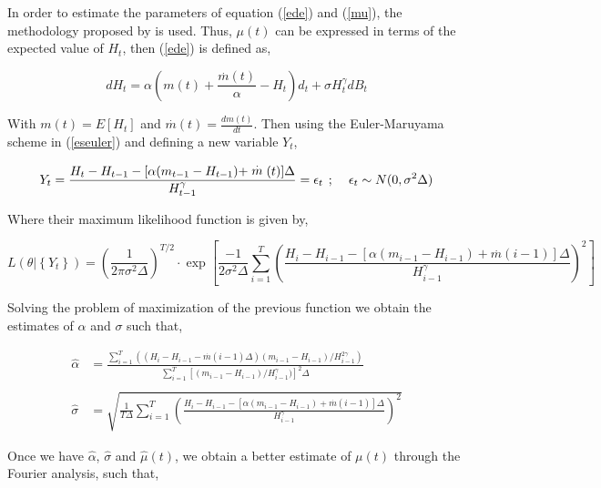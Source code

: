 \documentclass[12pt,halfline,a4paper]{ouparticle}
\begin{document}
In order to estimate the parameters of equation (\ref{ede}) and (\ref{mu}), the methodology proposed by \cite{Monsalve2017} is used. Thus, $\mu(t)$ can be expressed in terms of the expected value of $H_{t}$, then (\ref{ede}) is defined as,

\begin{equation}
\label{eseuler}
dH_{t}=\alpha \left(m(t)+\frac{\stackrel{.}{m}(t)}{\alpha}-H_{t}\right)d_{t}+\sigma H_{t}^{\gamma}dB_{t}
\end{equation}

With $m(t)=E[H_{t}]$ and $\stackrel{.}{m}(t)=\frac{dm(t)}{dt}$. Then using the Euler-Maruyama scheme in (\ref{eseuler}) and defining a new variable $Y_{t}$,

\begin{equation}
Y_{t}=\frac{H_{t}-H_{t-1}-[\alpha(m_{t-1}-H_{t-1})+\stackrel{.}{m}(t)]\Delta}{H_{t-1}^{\gamma}}=\epsilon_{t}  \hspace{0.15cm} ; \hspace{0.4cm} \epsilon_{t} \sim N(0,\sigma^{2}\Delta) 
\end{equation}

Where their maximum likelihood function is given by,

\begin{equation*}
L(\theta|\left\{Y_{t}\right\})=\left(\frac{1}{2\pi\sigma^{2}\Delta}\right)^{T/2}\cdot\exp\left[\frac{-1}{2\sigma^{2}\Delta}\sum_{i=1}^{T}\left(\frac{H_{i}-H_{i-1}-[\alpha(m_{i-1}-H_{i-1})+\stackrel{.}{m}(i-1)]\Delta}{H_{i-1}^{\gamma}}\right)^{2}\right]
\end{equation*}

Solving the problem of maximization of the previous function we obtain the estimates of $\alpha$ and $\sigma$ such that,

\begin{equation*}
\begin{split}
\hat{\alpha}&=\frac{\sum_{i=1}^{T}\left((H_{i}-H_{i-1}-\stackrel{.}{m}(i-1)\Delta)(m_{i-1}-H_{i-1})/H_{i-1}^{2\gamma}\right)}{\sum_{i=1}^{T}\left[(m_{i-1}-H_{i-1})/H_{i-1}^{\gamma})\right]^{2}\Delta}\\
\\
\hat{\sigma}&=\sqrt{\frac{1}{T\Delta}\sum_{i=1}^{T}\left(\frac{H_{i}-H_{i-1}-[\hat{\alpha}(m_{i-1}-H_{i-1})+\stackrel{.}{m}(i-1)]\Delta}{H_{i-1}^{\gamma}}\right)^{2}}
\end{split}
\end{equation*}

Once we have $\hat{\alpha}$, $\hat{\sigma}$ and $\hat{\mu}(t)$, we obtain a better estimate of $\mu(t)$ through the Fourier analysis, such that,
\end{document}
